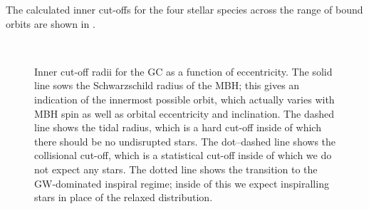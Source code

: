 The calculated inner cut-offs for the four stellar species across the range of bound orbits are shown in .
\begin{figure}%
\centering
    \quad 
    \\
    \quad
\caption{Inner cut-off radii for the GC as a function of eccentricity. The solid line sows the Schwarzschild radius of the MBH; this gives an indication of the innermost possible orbit, which actually varies with MBH spin as well as orbital eccentricity and inclination. The dashed line shows the tidal radius, which is a hard cut-off inside of which there should be no undisrupted stars. The dot--dashed line shows the collisional cut-off, which is a statistical cut-off inside of which we do not expect any stars. The dotted line shows the transition to the GW-dominated inspiral regime; inside of this we expect inspiralling stars in place of the relaxed distribution.}\label{fig:Cuts}
\end{figure}
